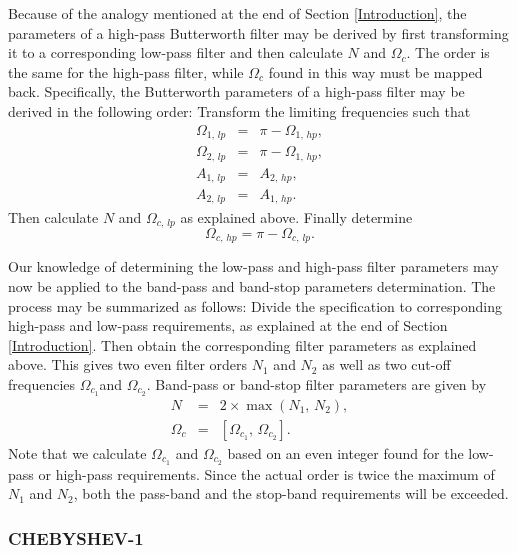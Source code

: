 \documentclass{sebase}
\begin{document}
\begin{remark}
Because of the analogy mentioned at the end of Section \ref{Introduction},
the parameters of a high-pass Butterworth filter may be derived by first
transforming it to a corresponding low-pass filter and then calculate $N$
and $\Omega _{c}$. The order is the same for the high-pass filter, while $%
\Omega _{c}$ found in this way must be mapped back. Specifically, the
Butterworth parameters of a high-pass filter may be derived in the following
order: Transform the limiting frequencies such that 
\begin{eqnarray}
\Omega _{1,\,lp} &=&\pi -\Omega _{1,\,hp}, \\
\Omega _{2,\,lp} &=&\pi -\Omega _{1,\,hp}, \\
A_{1,\,lp} &=&A_{2,\,hp}, \\
A_{2,\,lp} &=&A_{1,\,hp}.
\end{eqnarray}
Then calculate $N$ and $\Omega _{c,\,lp}$ as explained above. Finally
determine 
\begin{equation}
\Omega _{c,\,hp}=\pi -\Omega _{c,\,lp}.
\end{equation}
\end{remark}

\begin{remark}
Our knowledge of determining the low-pass and high-pass filter parameters
may now be applied to the band-pass and band-stop parameters determination.
The process may be summarized as follows: Divide the specification to
corresponding high-pass and low-pass requirements, as explained at the end
of Section \ref{Introduction}. Then obtain the corresponding filter
parameters as explained above. This gives two even filter orders $N_{1}$ and 
$N_{2}$ as well as two cut-off frequencies $\Omega _{c_{1}}$and $\Omega
_{c_{2}}$. Band-pass or band-stop filter parameters are given by 
\begin{eqnarray}
N &=&2\times \max \left( N_{1},\,N_{2}\right) ,  \label{N_Butter_BP_BS} \\
\Omega _{c} &=&\left[ \Omega _{c_{1}},\,\Omega _{c_{2}}\right] .
\label{Omega_c_Butter_BP_BS}
\end{eqnarray}
Note that we calculate $\Omega _{c_{1}}$ and $\Omega _{c_{2}}$ based on an
even integer found for the low-pass or high-pass requirements. Since the
actual order is twice the maximum of $N_{1}$ and $N_{2}$, both the pass-band
and the stop-band requirements will be exceeded.
\end{remark}

\subsubsection{CHEBYSHEV-1}
\end{document}
